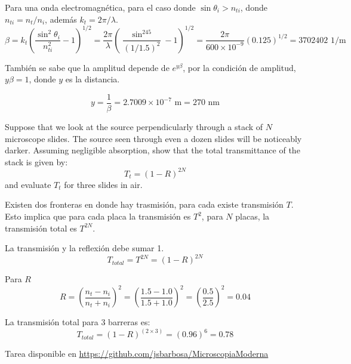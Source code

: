 \documentclass[addpoints,10pt]{exam}
\begin{document}
\begin{questions}
		Para una onda electromagn\'etica, para el caso donde $\sin\theta_i > n_{ti}$, donde $n_{ti} = n_{t}/n_{i}$, adem\'as $k_t = 2\pi/\lambda$.
		\begin{equation}
			\beta = k_t\left(\dfrac{\sin^2\theta_i}{n_{ti}^2} - 1\right)^{1/2} = \dfrac{2\pi}{\lambda}\left(\dfrac{\sin^245}{(1/1.5)^2} - 1\right)^{1/2} = \dfrac{2\pi}{600\times10^{-9}}(0.125)^{1/2}= 3702402 \text{ 1/m}
		\end{equation}
		
		Tambi\'en se sabe que la amplitud depende de $e^{y\beta}$, por la condici\'on de amplitud, $y\beta = 1$, donde $y$ es la distancia.
		
		\begin{equation}
			y = \dfrac{1}{\beta} = 2.7009\times 10^{-7}\text{ m} = 270 \text{ nm}
		\end{equation}
		
		{
			\question
			Suppose that we look at the source perpendicularly through a stack of $N$ microscope slides. The source seen through even a dozen slides will be noticeably darker. Assuming negligible absorption, show that the total transmittance of the stack is given by:
			\begin{equation*}
				T_t = (1-R)^{2N}
			\end{equation*}
			and evaluate $T_t$ for three slides in air.
		}
		
		Existen dos fronteras en donde hay trasmisi\'on, para cada existe transmisi\'on $T$. Esto implica que para cada placa la transmisi\'on es $T^2$, para $N$ placas, la transmisi\'on total es $T^{2N}$.
			
		La transmisi\'on y la reflexi\'on debe sumar 1.
		\begin{equation}
			T_{total} = T^{2N} = (1-R)^{2N}
		\end{equation}
		
		Para $R$
		\begin{equation}
			R = \left(\dfrac{n_t - n_i}{n_t  + n_i}\right)^2 = \left(\dfrac{1.5 - 1.0}{1.5 + 1.0}\right)^2 = \left(\dfrac{0.5}{2.5}\right)^2 = 0.04
		\end{equation}
		
		La transmisi\'on total para 3 barreras es:
		\begin{equation}
			T_{total} = (1 - R)^(2\times3) = (0.96)^6 = 0.78
		\end{equation}
	\end{questions}
	
	
	Tarea disponible en \url{https://github.com/jsbarbosa/MicroscopiaModerna}
	
\end{document}
